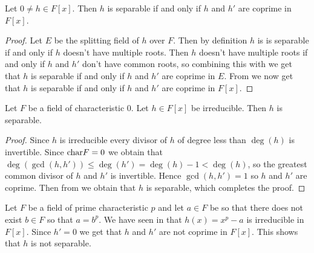 \documentclass[11pt,a4paper]{article}
\begin{document}
\begin{corollary}
  \label{cor:sep-iff-hdh-coprime}
  Let $0 \neq h \in F[x]$.
  Then $h$ is separable if and only if $h$ and $h'$ are coprime
  in $F[x]$.
\end{corollary}
\begin{proof}
  Let $E$ be the splitting field of $h$ over $F$.
  Then by definition
  $h$ is is separable if and only if
  $h$ doesn't have multiple roots.
  Then $h$ doesn't have multiple roots if and only if
  $h$ and $h'$ don't have common roots,
  so combining this with 
  we get that $h$ is separable if and only if $h$ and $h'$
  are coprime in $E$.
  From  we now get that $h$ is separable if and only if
  $h$ and $h'$ are coprime in $F[x]$.
\end{proof}

\begin{corollary}
  \label{cor:char-zero-implies-irreducible-implies-separable}
  Let $F$ be a field of characteristic $0$.
  Let $h \in F[x]$ be irreducible.
  Then $h$ is separable.
\end{corollary}
\begin{proof}
  Since $h$ is irreducible every divisor of $h$ of degree less than
  $\deg(h)$ is invertible.
  Since $\text{char} F = 0$
  we obtain that $\deg(\gcd(h,h')) \le \deg(h') = \deg(h) - 1 < \deg(h)$,
  so the greatest common divisor of $h$ and $h'$ is invertible.
  Hence $\gcd(h,h') = 1$ so $h$ and $h'$ are coprime.
  Then from  we obtain that $h$ is separable,
  which completes the proof.
\end{proof}

\begin{example}
  \label{exmp:irreducible-and-nonseparable}
  Let $F$ be a field of prime characteristic $p$
  and let $a \in F$ be so that there does not exist $b \in F$
  so that $a = b^p$.
  We have seen in 
  that $h(x) = x^p - a$ is irreducible in $F[x]$.
  Since $h' = 0$ we get that $h$ and $h'$ are not coprime in $F[x]$.
  This shows that $h$ is not separable.
\end{example}
\end{document}
